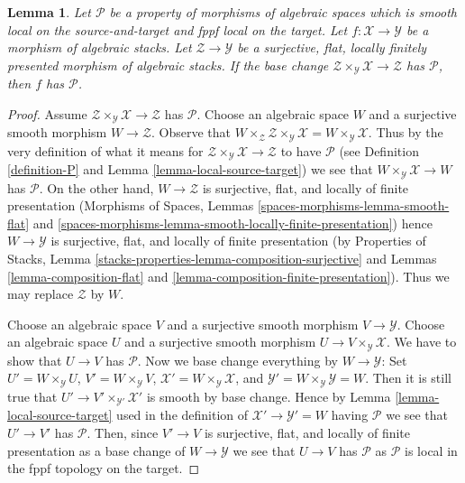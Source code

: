 \documentclass{stacks-project}
\theoremstyle{plain}
\newtheorem{lemma}[subsection]{Lemma}
\theoremstyle{definition}
\theoremstyle{remark}
\numberwithin{equation}{subsection}
\begin{document}
\begin{lemma}
\label{lemma-descent-property}
Let $\mathcal{P}$ be a property of morphisms of algebraic spaces
which is smooth local on the source-and-target and fppf local
on the target.
Let $f : \mathcal{X} \to \mathcal{Y}$ be a morphism of algebraic stacks.
Let $\mathcal{Z} \to \mathcal{Y}$ be a surjective, flat, locally finitely
presented morphism of algebraic stacks. If the base change
$\mathcal{Z} \times_\mathcal{Y} \mathcal{X} \to \mathcal{Z}$
has $\mathcal{P}$, then $f$ has $\mathcal{P}$.
\end{lemma}

\begin{proof}
Assume $\mathcal{Z} \times_\mathcal{Y} \mathcal{X} \to \mathcal{Z}$
has $\mathcal{P}$. Choose an algebraic space $W$ and a surjective
smooth morphism $W \to \mathcal{Z}$. Observe that
$W \times_\mathcal{Z} \mathcal{Z} \times_\mathcal{Y} \mathcal{X} =
W \times_\mathcal{Y} \mathcal{X}$. Thus by the very definition of
what it means for $\mathcal{Z} \times_\mathcal{Y} \mathcal{X} \to \mathcal{Z}$
to have $\mathcal{P}$ (see Definition \ref{definition-P}
and Lemma \ref{lemma-local-source-target})
we see that $W \times_\mathcal{Y} \mathcal{X} \to W$
has $\mathcal{P}$. On the other hand, $W \to \mathcal{Z}$
is surjective, flat, and locally of finite presentation
(Morphisms of Spaces, Lemmas
\ref{spaces-morphisms-lemma-smooth-flat} and
\ref{spaces-morphisms-lemma-smooth-locally-finite-presentation})
hence $W \to \mathcal{Y}$ is surjective, flat, and locally of finite
presentation (by
Properties of Stacks, Lemma
\ref{stacks-properties-lemma-composition-surjective}
and
Lemmas \ref{lemma-composition-flat} and
\ref{lemma-composition-finite-presentation}).
Thus we may replace $\mathcal{Z}$ by $W$.

\medskip\noindent
Choose an algebraic space $V$ and a surjective smooth morphism
$V \to \mathcal{Y}$. Choose an algebraic space $U$ and a surjective
smooth morphism $U \to V \times_\mathcal{Y} \mathcal{X}$.
We have to show that $U \to V$ has $\mathcal{P}$.
Now we base change everything by $W \to \mathcal{Y}$: Set
$U' = W \times_\mathcal{Y} U$,
$V' = W \times_\mathcal{Y} V$,
$\mathcal{X}' = W \times_\mathcal{Y} \mathcal{X}$,
and $\mathcal{Y}' = W \times_\mathcal{Y} \mathcal{Y} = W$.
Then it is still true that $U' \to V' \times_{\mathcal{Y}'} \mathcal{X}'$
is smooth by base change. Hence by Lemma \ref{lemma-local-source-target}
used in the definition of $\mathcal{X}' \to \mathcal{Y}' = W$
having $\mathcal{P}$ we see that $U' \to V'$ has $\mathcal{P}$.
Then, since $V' \to V$ is surjective, flat, and locally of finite presentation
as a base change of $W \to \mathcal{Y}$ we see that $U \to V$
has $\mathcal{P}$ as $\mathcal{P}$ is local in the fppf topology
on the target.
\end{proof}
\end{document}

